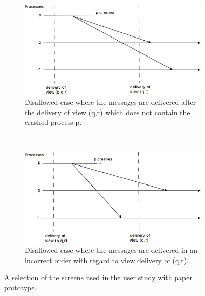\begin{figure}
\begin{subfigure}[t]{0.4\textwidth}
                                        \centering
                                        \includegraphics[width=\textwidth]{img/viewsynchronousgroupcommunication_c}
                                        \caption{Disallowed case where the messages are delivered after the delivery of view (q,r) which does not contain the crashed process p.}
                                        \label{figure:viewsynchronousgroupcommunication:c}
        \end{subfigure}
        ~
        \begin{subfigure}[t]{0.4\textwidth}
                                        \centering
                                        \includegraphics[width=\textwidth]{img/viewsynchronousgroupcommunication_d}
                                        \caption{Disallowed case where the messages are delivered in an incorrect order with regard to view delivery of (q,r).}
                                        \label{figure:viewsynchronousgroupcommunication:d}
        \end{subfigure}
        \caption{A selection of the screens used in the user study with paper prototype.}%
        \label{figure:viewsynchronousgroupcommunication}%
\end{figure}


